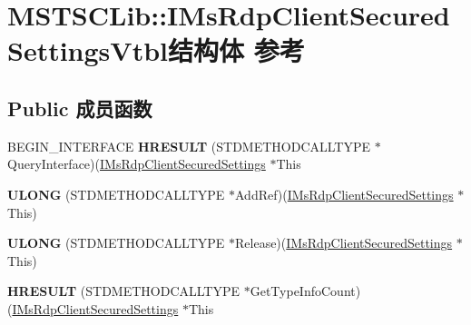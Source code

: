 \hypertarget{struct_m_s_t_s_c_lib_1_1_i_ms_rdp_client_secured_settings_vtbl}{}\section{M\+S\+T\+S\+C\+Lib\+:\+:I\+Ms\+Rdp\+Client\+Secured\+Settings\+Vtbl结构体 参考}
\label{struct_m_s_t_s_c_lib_1_1_i_ms_rdp_client_secured_settings_vtbl}
\subsection*{Public 成员函数}
\begin{DoxyCompactItemize}
\item 
\mbox{\label{struct_m_s_t_s_c_lib_1_1_i_ms_rdp_client_secured_settings_vtbl_ab59988b06bf44d45df46490b24cba71e}} 
B\+E\+G\+I\+N\+\_\+\+I\+N\+T\+E\+R\+F\+A\+CE {\bfseries H\+R\+E\+S\+U\+LT} (S\+T\+D\+M\+E\+T\+H\+O\+D\+C\+A\+L\+L\+T\+Y\+PE $\ast$Query\+Interface)(\hyperlink{interface_m_s_t_s_c_lib_1_1_i_ms_rdp_client_secured_settings}{I\+Ms\+Rdp\+Client\+Secured\+Settings} $\ast$This
\item 
\mbox{\label{struct_m_s_t_s_c_lib_1_1_i_ms_rdp_client_secured_settings_vtbl_a16eda4fc6be0aebcaedd1a5b69e0b0a3}} 
{\bfseries U\+L\+O\+NG} (S\+T\+D\+M\+E\+T\+H\+O\+D\+C\+A\+L\+L\+T\+Y\+PE $\ast$Add\+Ref)(\hyperlink{interface_m_s_t_s_c_lib_1_1_i_ms_rdp_client_secured_settings}{I\+Ms\+Rdp\+Client\+Secured\+Settings} $\ast$This)
\item 
\mbox{\label{struct_m_s_t_s_c_lib_1_1_i_ms_rdp_client_secured_settings_vtbl_a8eab00ee64ee1e9f3ed9700b3b15d5c0}} 
{\bfseries U\+L\+O\+NG} (S\+T\+D\+M\+E\+T\+H\+O\+D\+C\+A\+L\+L\+T\+Y\+PE $\ast$Release)(\hyperlink{interface_m_s_t_s_c_lib_1_1_i_ms_rdp_client_secured_settings}{I\+Ms\+Rdp\+Client\+Secured\+Settings} $\ast$This)
\item 
\mbox{\label{struct_m_s_t_s_c_lib_1_1_i_ms_rdp_client_secured_settings_vtbl_a182209e9fcd08836ac50921871b3e8d3}} 
{\bfseries H\+R\+E\+S\+U\+LT} (S\+T\+D\+M\+E\+T\+H\+O\+D\+C\+A\+L\+L\+T\+Y\+PE $\ast$Get\+Type\+Info\+Count)(\hyperlink{interface_m_s_t_s_c_lib_1_1_i_ms_rdp_client_secured_settings}{I\+Ms\+Rdp\+Client\+Secured\+Settings} $\ast$This

\end{DoxyCompactItemize}
